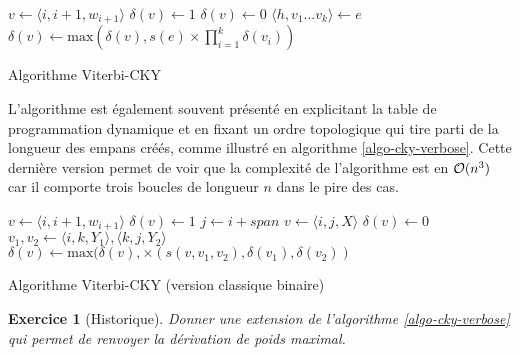 \documentclass[11pt,openany]{book}
\newtheorem{exo}{Exercice}[chapter]
\begin{document}
\begin{algorithm}
\begin{algorithmic}[htbp]
\State $v \gets \langle i,i+1,w_{i+1} \rangle$
\State $\delta(v) \gets 1$
\EndFor
{}
\State $\delta (v) \gets 0$
\State $\langle h, v_1\ldots v_k\rangle \gets e$
\State $\delta(v) \gets \text{max} \left(\delta(v) , s(e) \times
\prod_{i=1}^k \delta(v_i)\right)$
\EndFor
\EndFor
\EndFunction
\end{algorithmic}
\caption{\label{algo-cky} Algorithme Viterbi-CKY}
\end{algorithm}

L'algorithme est également souvent présenté en explicitant la table de programmation dynamique et en fixant un ordre topologique 
qui tire parti de la longueur des empans créés, comme illustré en algorithme \ref{algo-cky-verbose}.
Cette dernière version permet de voir que la complexité de l'algorithme est en ${\cal O}(n^3)$ car il comporte trois boucles de longueur $n$
dans le pire des cas.

\begin{algorithm}[htbp]
\begin{algorithmic}
\State $v \gets \langle i,i+1,w_{i+1} \rangle$
\State $\delta(v) \gets 1$
\EndFor
{}
\State $j \gets i+span$
\State $v \gets \langle i,j,X \rangle$
\State $\delta(v) \gets 0$
\State $v_1,v_2 \gets \langle i,k,Y_1 \rangle,\langle k,j,Y_2 \rangle$
\State $\delta(v) \gets \text{max}(\delta(v), \times(s(v,v_1,v_2),\delta(v_1),\delta(v_2))$
\EndFor
\EndFor
\EndFor
\EndFor
\EndFor
\EndFunction
\end{algorithmic}
\caption{\label{algo-cky-verbose} Algorithme Viterbi-CKY (version classique binaire)}
\end{algorithm}

\begin{exo}[Historique]
Donner une extension de l'algorithme \ref{algo-cky-verbose} qui permet de renvoyer la dérivation de poids maximal.
\end{exo}
\end{document}
